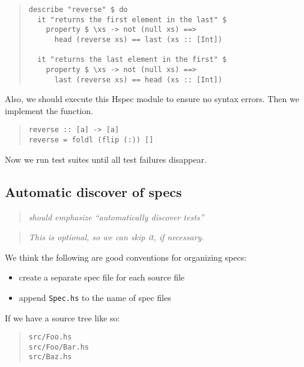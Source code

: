 \documentclass[preprint]{sigplanconf}
\begin{document}
\begin{quote}
\small
\begin{verbatim}
describe "reverse" $ do
  it "returns the first element in the last" $
    property $ \xs -> not (null xs) ==>
      head (reverse xs) == last (xs :: [Int])

  it "returns the last element in the first" $
    property $ \xs -> not (null xs) ==>
      last (reverse xs) == head (xs :: [Int])
\end{verbatim}
\end{quote}

\noindent Also, we should execute this Hspec module
to ensure no syntax errors.
Then we implement the function.

\begin{quote}
\small
\begin{verbatim}
reverse :: [a] -> [a]
reverse = foldl (flip (:)) []
\end{verbatim}
\end{quote}

\noindent Now we run test suites until
all test failures disappear.

\subsection{Automatic discover of specs}

\begin{quote}
    \emph{should emphasize ``automatically discover tests''}
\end{quote}

\begin{quote}
\emph{This is optional, so we can skip it, if necessary.}
\end{quote}

\noindent We think the following are good conventions for organizing specs:
\begin{itemize}
    \item create a separate spec file for each source file
    \item append {\tt Spec.hs} to the name of spec files
\end{itemize}

\noindent If we have a source tree like so:

\begin{quote}
\small
\begin{verbatim}
src/Foo.hs
src/Foo/Bar.hs
src/Baz.hs
\end{verbatim}
\end{quote}
\end{document}
